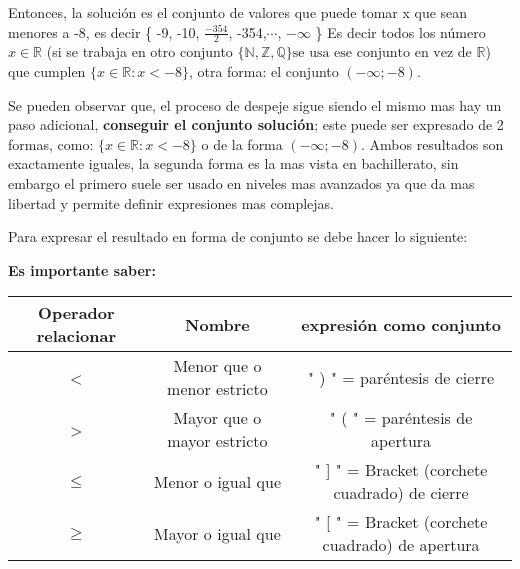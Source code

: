     Entonces, la solución es el conjunto de valores que puede tomar x que sean
    menores a -8, es decir \{ -9, -10, $\displaystyle\frac{-354}{2} $, -354,$\cdots$, $-\infty$   \}
    Es decir todos los número $x \in \mathbb{R}$ (si se trabaja en otro conjunto
    $\{\mathbb{N},\mathbb{Z},\mathbb{Q}\} \text{se usa ese conjunto en vez de }\mathbb{R}$)
    que cumplen $\{x \in \mathbb{R}:x < -8\}$, otra forma: el conjunto $(-\infty;-8)$.

    Se pueden observar que, el proceso de despeje sigue siendo el mismo mas hay
    un paso adicional, \textbf{conseguir el conjunto solución}; este puede ser
    expresado de 2 formas, como: $\{x \in \mathbb{R}:x < -8\}$ o de la forma
    $(-\infty;-8)$. Ambos resultados son exactamente iguales, la segunda forma
    es la mas vista en bachillerato, sin embargo el primero suele
    ser usado en niveles mas avanzados ya que da mas libertad y permite definir
    expresiones mas complejas.

    Para expresar el resultado en forma de conjunto se debe hacer lo siguiente:

    \textbf{Es importante saber: }


\begin{table}[H] \label{operadores-relacionales-a-conjuntos}
    \begin{adjustwidth}{-.5in}{-.5in}
        \begin{center}

            \begin{tabular}{|c|c|c|}
                \hline


                Operador relacionar & Nombre                        & expresión como conjunto\\\hline
                <                   & Menor que o menor estricto    & " ) " = paréntesis de cierre \\\hline
                >                   & Mayor que o mayor estricto    & " ( " = paréntesis de apertura\\\hline
                $\leq$              & Menor o igual que             & " ] " = Bracket (corchete cuadrado) de cierre \\\hline
                $\geq$              & Mayor o igual que             & " [ " = Bracket (corchete cuadrado) de apertura \\

                \hline
            \end{tabular}

        \end{center}
    \end{adjustwidth}
\end{table}


